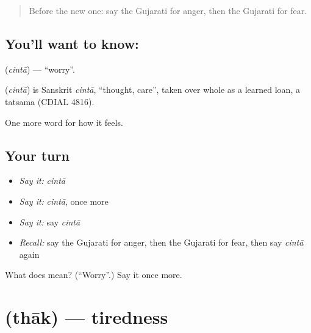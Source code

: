 \label{lesson:GU-C50-worry}



\begin{quote}
Before the new one: say the Gujarati for anger, then the Gujarati for fear.
\end{quote}

\subsection*{You'll want to know: }
\textbf{} (\emph{cintā}) — \textquotedblleft{}worry\textquotedblright{}.

\begin{cousinweb}
\textbf{} (\emph{cintā}) is Sanskrit \emph{cintā}, \textquotedblleft{}thought, care\textquotedblright{}, taken over whole as a learned loan, a tatsama (CDIAL 4816).
\end{cousinweb}

\begin{grammarlens}[title={What you've built}]
One more word for how it feels.
\end{grammarlens}

\subsection*{Your turn}
\begin{itemize}
\raggedright
  \item \emph{Say it:} \emph{cintā}
  \item \emph{Say it:} \emph{cintā}, once more
  \item \emph{Say it:} say \emph{cintā}
  \item \emph{Recall:} say the Gujarati for anger, then the Gujarati for fear, then say \emph{cintā} again
\end{itemize}

\begin{tcolorbox}[breakable,colback=teal!4,colframe=teal!35!black,title={Before you move on}]
What does  mean? (\textquotedblleft{}Worry\textquotedblright{}.) Say it once more.
\end{tcolorbox}
\section[\texorpdfstring{\gu{થાક} (thāk)}{થાક (thāk)}]{ (thāk) — tiredness}

\label{lesson:GU-C50-tiredness}



